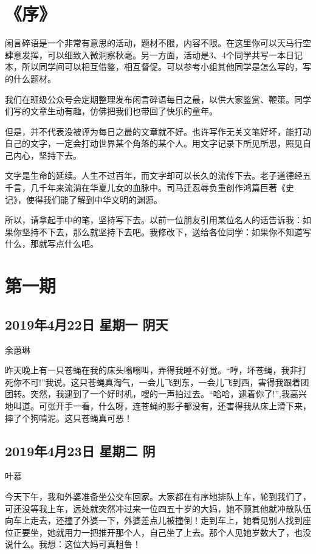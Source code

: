 \chapter{《序》}

闲言碎语是一个非常有意思的活动，题材不限，内容不限。在这里你可以天马行空肆意发挥，可以细致入微洞察秋毫。另一方面，活动是3、4个同学共写一本日记本，所以同学间可以相互借鉴，相互督促。可以参考小组其他同学是怎么写的，写的什么题材。

我们在班级公众号会定期整理发布闲言碎语每日之最，以供大家鉴赏、鞭策。同学们写的文章生动有趣，仿佛把我们也带回了快乐的童年。

但是，并不代表没被评为每日之最的文章就不好。也许写作无关文笔好坏，能打动自己的文字，一定会打动世界某个角落的某个人。用文字记录下所见所思，照见自己内心，坚持下去。

文字是生命的延续。人生不过百年，而文字却可以长久的流传下去。老子道德经五千言，几千年来流淌在华夏儿女的血脉中。司马迁忍辱负重创作鸿篇巨著《史记》，使得我们能了解到中华文明的渊源。

所以，请拿起手中的笔，坚持写下去。以前一位朋友引用某位名人的话告诉我：如果你坚持不下去，那么就坚持下去吧。我修改下，送给各位同学：如果你不知道写什么，那就写点什么吧。

\chapter{第一期}

\section{2019年4月22日 星期一 阴天}

余蕙琳

昨天晚上有一只苍蝇在我的床头嗡嗡叫，弄得我睡不好觉。``哼，坏苍蝇，我非打死你不可!''我说。这只苍蝇真淘气，一会儿飞到东，一会儿飞到西，害得我跟着团团转。突然，我逮到了一个好时机，嗖的一声拍过去。``哈哈，逮着你了!'',我高兴地叫道。可张开手一看，什么呀，连苍蝇的影子都没有，还害得我从床上滑下来，摔了个狗啃泥。这只苍蝇真可恶！

\section{2019年4月23日 星期二 阴}

叶慕

今天下午，我和外婆准备坐公交车回家。大家都在有序地排队上车，轮到我们了，可还没等我上车，远处就突然冲过来一位四五十岁的大妈，她不顾其他就冲散队伍向车上走去，还撞了外婆一下，外婆差点儿被撞倒！走到车上，她看见别人找到座位正要坐，她就用力一把推开那个人，自己坐了上去。那个人见她岁数大了，也没说什么。我想：这位大妈可真粗鲁！

